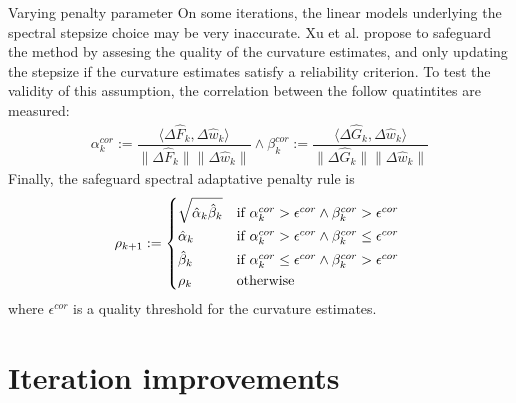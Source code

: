 \documentclass[8pt,red]{beamer}
\theoremstyle{plain}
\theoremstyle{definition}
\theoremstyle{remark}
\begin{document}
\begin{frame}{Varying penalty parameter}
On some iterations, the linear models underlying the spectral stepsize choice may be very inaccurate. Xu et al. propose to safeguard the method by assesing the quality of the curvature estimates, and only updating the stepsize if the curvature estimates satisfy a reliability criterion. To test the validity of this assumption, the correlation between the follow quatintites are measured:
\begin{align}
  \alpha_{k}^{cor} := \dfrac{\langle \Delta \hat{F}_{k} , \Delta \hat{w}_{k} \rangle}{ \|\Delta \hat{F}_{k}\|  \|\Delta \hat{w}_{k}\|}
  \wedge
  \beta_{k}^{cor} := \dfrac{\langle \Delta \hat{G}_{k} , \Delta \hat{w}_{k} \rangle}{ \|\Delta \hat{G}_{k}\|  \|\Delta \hat{w}_{k}\|}  
\end{align}
Finally, the safeguard spectral adaptative penalty rule is
\begin{align}
  \rho_{k+1} := 
  \begin{dcases*}
	\sqrt{\hat{\alpha}_{k} \hat{\beta}_{k}}
    & if $ \alpha_{k}^{cor} > \epsilon^{cor} \wedge \beta_{k}^{cor} > \epsilon^{cor} $ \\
    \hat{\alpha}_{k}
    & if $ \alpha_{k}^{cor} > \epsilon^{cor} \wedge \beta_{k}^{cor} \leq \epsilon^{cor} $ \\
    \hat{\beta}_{k}
    & if $ \alpha_{k}^{cor} \leq \epsilon^{cor} \wedge \beta_{k}^{cor} > \epsilon^{cor} $ \\
    \rho_{k}
    & otherwise \\
  \end{dcases*} 
\end{align}
where $\epsilon^{cor}$ is a quality threshold for the curvature estimates.
\end{frame}

\section{Iteration improvements}
\end{document}
